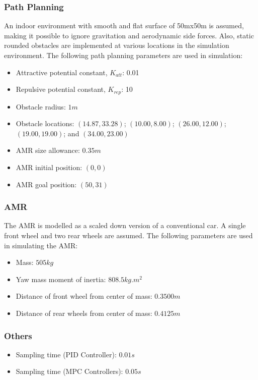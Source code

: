 \documentclass[a4paper, twocolumn]{article}
\begin{document}
\subsubsection{Path Planning}
An indoor environment with smooth and flat surface of 50mx50m is assumed, making it possible to ignore gravitation and aerodynamic side forces. 
Also, static rounded obstacles are implemented at various locations in the simulation environment. 
The following path planning parameters are used in simulation:
\noindent
\begin{itemize}[itemsep=2pt]
    \item Attractive potential constant, $K_{att}$: 0.01
    \item Repulsive potential constant, $K_{rep}$: 10
    \item Obstacle radius: $1m$
    \item Obstacle locations: $(14.87,33.28)$; $(10.00,8.00)$; $(26.00,12.00)$; $(19.00,19.00)$; and $(34.00,23.00)$ 
    \item AMR size allowance: $0.35m$
    \item AMR initial position: $(0,0)$
    \item AMR goal position: $(50, 31)$
\end{itemize}

\subsubsection{AMR}
The AMR is modelled as a scaled down version of a conventional car. A single front wheel and two rear wheels are assumed. 
The following parameters are used in simulating the AMR:
\noindent
\begin{itemize}[itemsep=2pt]
    \item Mass: $505kg$
    \item Yaw mass moment of inertia: $808.5kg.{m}^{2}$
    \item Distance of front wheel from center of mass: $0.3500m$
    \item Distance of rear wheels from center of mass: $0.4125m$
\end{itemize}

\subsubsection{Others}
\noindent
\begin{itemize}
    \item Sampling time (PID Controller): $0.01s$
    \item Sampling time (MPC Controllers): $0.05s$
\end{itemize}
\end{document}
